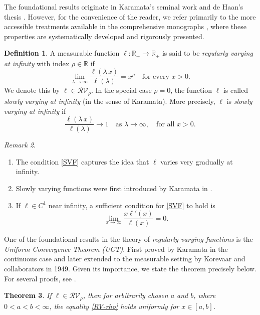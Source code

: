 \documentclass[12pt,reqno]{amsart}
\theoremstyle{plain}
\newtheorem{thm}{Theorem}[section]
\theoremstyle{definition}
\newtheorem{defi}[thm]{Definition}
\theoremstyle{remark}
\newtheorem{rem}[thm]{Remark}
\numberwithin{equation}{section}
\renewcommand{\L}{\ell}
\begin{document}
The foundational results originate in Karamata's seminal work \cite{Karama1} and de Haan's thesis \cite{Haan}. However, for the convenience of the reader, we refer primarily to the more accessible treatments available in the comprehensive monographs \cite{Bing-Book, Geluk, Haan-Book, Seneta-Book}, where these properties are systematically developed and rigorously presented.

\begin{defi}
\label{RVF}
A measurable function $\L : \mathbb{R}_+ \to \mathbb{R}_+$ is said to be \emph{regularly varying at infinity} with index $\rho \in \mathbb{R}$ if  
\begin{equation}
    \label{RV-rho}
    \lim_{\lambda \to \infty} \frac{\L(\lambda\,x)}{\L(\lambda)} = x^\rho \quad \text{for every } x > 0.
\end{equation}
We denote this by $\L \in \mathcal{RV}_\rho$. In the special case $\rho = 0$, the function $\L$ is called \emph{slowly varying at infinity} (in the sense of Karamata). More precisely, $\L$ is \emph{slowly varying at infinity} if
\begin{equation}
    \label{SVF}
    \frac{\ell (\lambda\, x)}{\ell (\lambda)} \to 1 \quad \text{as } \lambda \to \infty, \quad \text{for all } x> 0. 
\end{equation}
\end{defi}
\begin{rem}\rm 
    ~\begin{enumerate}[label=(\roman*)]
        \item The condition \eqref{SVF} captures the idea that $\ell $ varies very gradually at infinity.
\item Slowly varying functions were first introduced by Karamata in \cite{Karama1, Karama2}.
\item If $ \ell \in C^1 $ near infinity, a sufficient condition for \eqref{SVF} to hold is
\begin{equation}
    \label{SVFF}
    \lim_{x \to \infty} \frac{x\ell'(x)}{\ell(x)} = 0.
\end{equation}

\end{enumerate}
\end{rem}
One of the foundational results in the theory of \emph{regularly varying functions} is the \emph{Uniform Convergence Theorem (UCT)}. First proved by Karamata in the continuous case and later extended to the measurable setting by Korevaar and collaborators in 1949. Given its importance, we state the theorem precisely below. For several proofs, see \cite[Theorem~1.2.1, p.~6]{Bing-Book}.
\begin{thm}
    \label{UC-Thm}
If $\L \in \mathcal{RV}_\rho$, then for arbitrarily chosen $a$ and $b$, where $0 < a < b < \infty$, the equality \eqref{RV-rho} holds uniformly for $x \in [a, b]$.
\end{thm}
\end{document}
